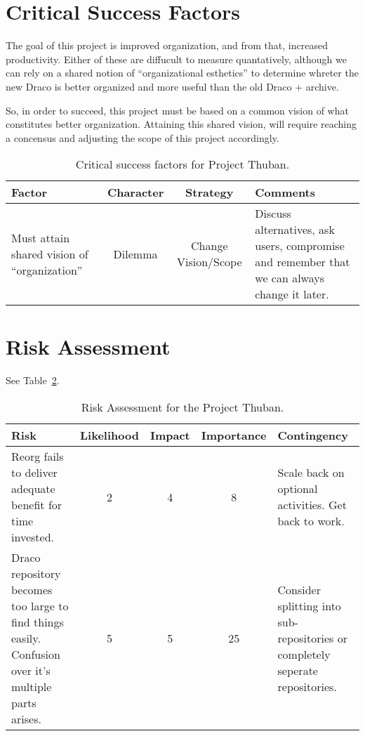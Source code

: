 \documentclass[note]{ResearchNote_pdf}
\begin{document}
\section*{Critical Success Factors}

The goal of this project is improved organization, and from that,
increased productivity. Either of these are diffucult to measure
quantatively, although we can rely on a shared notion of
``organizational esthetics'' to determine whreter the new {\sf Draco}
is better organized and more useful than the old {\sf Draco} + {\sf
  archive}.

So, in order to succeed, this project must be based on a common vision
of what constitutes better organization. Attaining this shared vision,
will require reaching a concensus and adjusting the scope of this
project accordingly. 

\begin{table}[ht]
  \begin{center}
    \caption{Critical success factors for Project Thuban.}
    \label{tab:critical-success}
    \begin{tabular}{|p{4.5cm}|c|c|p{4.5cm}|} 
    \hline
    Factor             &  Character   & Strategy & Comments \\ 
    \hline\hline
    Must attain shared vision of ``organization'' & 
    Dilemma & Change Vision/Scope &
    Discuss alternatives, ask users, compromise and remember that we
    can always change it later. \\ \hline
    \end{tabular}
  \end{center}
\end{table}

\section*{Risk Assessment}

See Table~\ref{tab:risk}.

\begin{table}[ht]
  \begin{center}
    \caption{Risk Assessment for the Project Thuban.}
    \label{tab:risk}
    \begin{tabular}{|p{4.5cm}|c|c|c|p{4.5cm}|} 
    \hline
    Risk & Likelihood & Impact & Importance & Contingency \\
    \hline\hline
    Reorg fails to deliver adequate benefit for time invested. &
    2 & 4 & 8 & 
    Scale back on optional activities. Get back to  work. \\ \hline
    Draco repository becomes too large to find things
    easily. Confusion over it's multiple parts arises. & 
    5 & 5 & 25 &
    Consider splitting into sub-repositories or completely seperate
    repositories. \\ \hline
    \end{tabular}
  \end{center}
\end{table}
\end{document}
